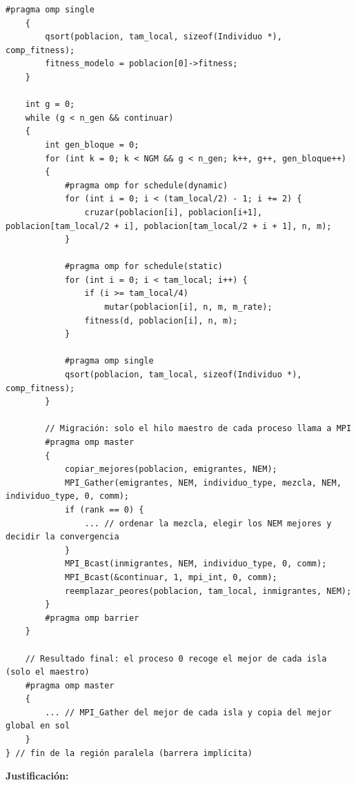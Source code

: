 \documentclass[12pt]{article}
\begin{document}
\begin{enumerate}
\begin{lstlisting}[style=EstiloC]
	#pragma omp single
	{
		qsort(poblacion, tam_local, sizeof(Individuo *), comp_fitness);
		fitness_modelo = poblacion[0]->fitness;
	}

	int g = 0;
	while (g < n_gen && continuar)
	{
		int gen_bloque = 0;
		for (int k = 0; k < NGM && g < n_gen; k++, g++, gen_bloque++)
		{
			#pragma omp for schedule(dynamic)
			for (int i = 0; i < (tam_local/2) - 1; i += 2) {
				cruzar(poblacion[i], poblacion[i+1], poblacion[tam_local/2 + i], poblacion[tam_local/2 + i + 1], n, m);
			}

			#pragma omp for schedule(static)
			for (int i = 0; i < tam_local; i++) {
				if (i >= tam_local/4)
					mutar(poblacion[i], n, m, m_rate);
				fitness(d, poblacion[i], n, m);
			}

			#pragma omp single
			qsort(poblacion, tam_local, sizeof(Individuo *), comp_fitness);
		}

		// Migración: solo el hilo maestro de cada proceso llama a MPI
		#pragma omp master
		{
			copiar_mejores(poblacion, emigrantes, NEM);
			MPI_Gather(emigrantes, NEM, individuo_type, mezcla, NEM, individuo_type, 0, comm);
			if (rank == 0) {
				... // ordenar la mezcla, elegir los NEM mejores y decidir la convergencia
			}
			MPI_Bcast(inmigrantes, NEM, individuo_type, 0, comm);
			MPI_Bcast(&continuar, 1, mpi_int, 0, comm);
			reemplazar_peores(poblacion, tam_local, inmigrantes, NEM);
		}
		#pragma omp barrier
	}

	// Resultado final: el proceso 0 recoge el mejor de cada isla (solo el maestro)
	#pragma omp master
	{
		... // MPI_Gather del mejor de cada isla y copia del mejor global en sol
	}
} // fin de la región paralela (barrera implícita)
\end{lstlisting}

\textbf{Justificación:}


\end{enumerate}
\end{document}
